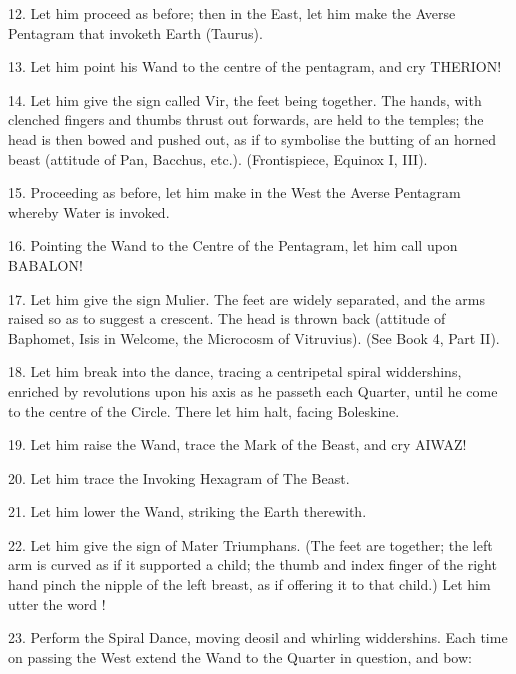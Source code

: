 12. Let him proceed as before; then in the East, let him make the Averse Pentagram that invoketh Earth (Taurus).

13. Let him point his Wand to the centre of the pentagram, and cry THERION!

14. Let him give the sign called Vir, the feet being together. The hands, with clenched fingers and thumbs thrust out forwards, are held to the temples; the head is then bowed and pushed out, as if to symbolise the butting of an horned beast (attitude of Pan, Bacchus, etc.). (Frontispiece, Equinox I, III).

15. Proceeding as before, let him make in the West the Averse Pentagram whereby Water is invoked.

16. Pointing the Wand to the Centre of the Pentagram, let him call upon BABALON!

17. Let him give the sign Mulier. The feet are widely separated, and the arms raised so as to suggest a crescent. The head is thrown back (attitude of Baphomet, Isis in Welcome, the Microcosm of Vitruvius). (See Book 4, Part II).

18. Let him break into the dance, tracing a centripetal spiral widdershins, enriched by revolutions upon his axis as he passeth each Quarter, until he come to the centre of the Circle. There let him halt, facing Boleskine.

19. Let him raise the Wand, trace the Mark of the Beast, and cry AIWAZ!

20. Let him trace the Invoking Hexagram of The Beast.

21. Let him lower the Wand, striking the Earth therewith.

22. Let him give the sign of Mater Triumphans. (The feet are together; the left arm is curved as if it supported a child; the thumb and index finger of the right hand pinch the nipple of the left breast, as if offering it to that child.) Let him utter the word \Thelema{}!

23. Perform the Spiral Dance, moving deosil and whirling widdershins. Each time on passing the West extend the Wand to the Quarter in question, and bow:

